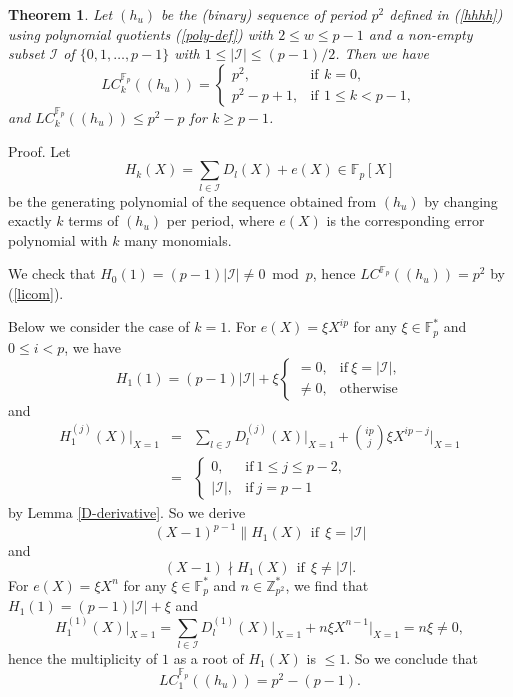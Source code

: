 \documentclass [11pt,a4paper]{article}
\def\F{\mathbb{F}}
\def\Z{\mathbb{Z}}
\newtheorem{theorem}{Theorem}
\begin{document}
\begin{theorem}\label{klc-p-w=2}
Let $(h_u)$ be the (binary) sequence of period $p^{2}$ defined in (\ref{hhhh}) using polynomial quotients (\ref{poly-def}) with $2\le w\le p-1$ and a non-empty subset $\mathcal{I}$ of $\{0,1,\ldots,p-1\}$ with $1\le |\mathcal{I}|\le (p-1)/2$.
Then we have
\[
 LC^{\F_p}_k((h_u))=\left\{
\begin{array}{cl}
p^2, & \mathrm{if}\,\ k=0, \\
p^2-p+1, & \mathrm{if}\,\ 1\le k<p-1,
\end{array}
\right.
\]
and $LC^{\F_p}_k((h_u))\le  p^2-p$ for $k\ge p-1$.
\end{theorem}
Proof. Let
$$
H_k(X)=\sum\limits_{l\in \mathcal{I}}D_{l}(X)+e(X)\in \F_p[X]
$$
be the generating polynomial of the sequence obtained from $(h_u)$ by changing exactly $k$ terms of $(h_u)$ per period,
where $e(X)$ is the corresponding error polynomial with $k$ many  monomials.

We check that $H_0(1)=(p-1)|\mathcal{I}|\neq 0 \bmod p$, hence $LC^{\F_p}((h_u))=p^2$ by (\ref{licom}).

Below we consider the case of $k=1$. For $e(X)=\xi X^{ip}$ for any $\xi\in\F_p^*$ and $0\le i<p$,
we have
$$
H_1(1)=(p-1)|\mathcal{I}|+\xi \left\{
\begin{array}{cl}
=0, & \mathrm{if}~\xi=|\mathcal{I}|,\\
\neq 0, & \mathrm{otherwise}
\end{array}
\right.
$$
 and
\begin{eqnarray*}
H^{(j)}_1(X)\bigg|_{X=1}& = & \sum\limits_{l\in \mathcal{I}}D^{(j)}_{l}(X)\bigg|_{X=1}+\binom{ip}{j}\xi X^{ip-j}\bigg|_{X=1}\\
                        & = &
\left\{
\begin{array}{cl}
0, & \mathrm{if}~1\le j\le p-2,\\
|\mathcal{I}|, & \mathrm{if}~ j=p-1
\end{array}
\right.
\end{eqnarray*}
by Lemma \ref{D-derivative}. So we derive
$$
(X-1)^{p-1}\| H_1(X) ~~\mathrm{if} ~~ \xi=|\mathcal{I}|
$$
and
$$
(X-1)\nmid H_1(X) ~~\mathrm{if} ~~ \xi\neq |\mathcal{I}|.
$$
For $e(X)=\xi X^{n}$ for any $\xi\in\F_p^*$ and $n\in\Z_{p^2}^*$,  we find that $H_1(1)=(p-1)|\mathcal{I}|+\xi$ and
$$
H^{(1)}_1(X)\bigg|_{X=1}=\sum\limits_{l\in \mathcal{I}}D^{(1)}_{l}(X)\bigg|_{X=1}+n\xi X^{n-1}\bigg|_{X=1}=n\xi \neq 0,
$$
hence the multiplicity of $1$ as a root of $ H_1(X)$ is $\le 1$. So we conclude that
$$LC^{\F_p}_1((h_u))=p^2-(p-1).$$
\end{document}
